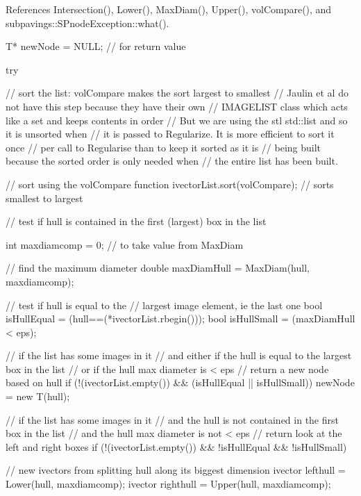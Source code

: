 \-References \-Intersection(), \-Lower(), \-Max\-Diam(), \-Upper(), vol\-Compare(), and subpavings\-::\-S\-Pnode\-Exception\-::what().


\begin{DoxyCode}
{
    T* newNode = NULL;  // for return value

    try {

        // sort the list: volCompare makes the sort largest to smallest
        // Jaulin et al do not have this step because they have their own
        // IMAGELIST class which acts like a set and keeps contents in order
        // But we are using the stl std::list and so it is unsorted when
        // it is passed to Regularize.  It is more efficient to sort it once
        // per call to Regularise than to keep it sorted as it is
        // being built because the sorted order is only needed when
        // the entire list has been built.

        // sort using the volCompare function
        ivectorList.sort(volCompare);   // sorts smallest to largest

        // test if hull is contained in the first (largest) box in the list

        int maxdiamcomp = 0;  // to take value from MaxDiam

        // find the maximum diameter
        double maxDiamHull = MaxDiam(hull, maxdiamcomp);

        // test if hull is equal to the
            // largest image element, ie the last one
        bool isHullEqual = (hull==(*ivectorList.rbegin()));
        bool isHullSmall = (maxDiamHull < eps);

        // if the list has some images in it
        // and either if the hull is equal to the largest box in the list
        // or if the hull max diameter is < eps
        // return a new node based on hull
        if (!(ivectorList.empty()) && (isHullEqual || isHullSmall)) {
            newNode = new T(hull);
        }

        // if the list has some images in it
        // and the hull is not contained in the first box in the list
        // and the hull max diameter is not < eps
        // return look at the left and right boxes
        if (!(ivectorList.empty()) && !isHullEqual && !isHullSmall) {

            // new ivectors from splitting hull along its biggest dimension
            ivector lefthull = Lower(hull, maxdiamcomp);
            ivector righthull = Upper(hull, maxdiamcomp);

}}}
\end{DoxyCode}
